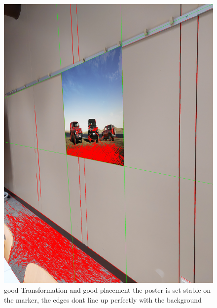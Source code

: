 \documentclass[a4paper,twocolumn]{article}
\begin{document}
    \begin{figure}[h!]
    \centering
    \includegraphics[width=0.9\columnwidth]{img/20221115_113424.jpg} %
    \caption{good Transformation and good placement the poster is set stable on the marker, the edges dont line up perfectly with the background}
    \label{fig:20221115_113424.jpg}
    \end{figure}
    
\end{document}

